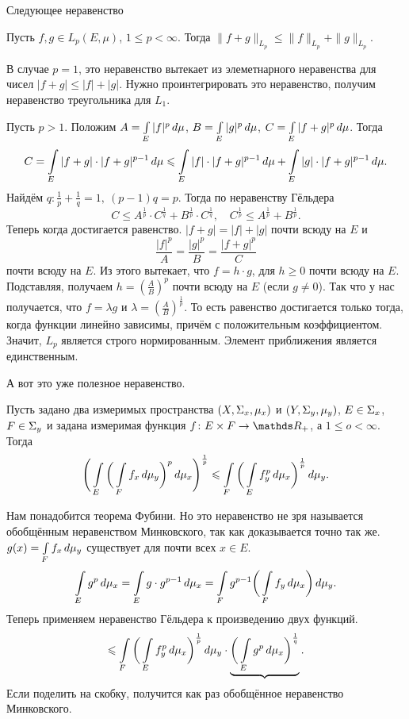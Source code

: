 Следующее неравенство
\begin{Ut}
  Пусть $f,g\in L_p(E,\mu)$, $1\le p<\infty$. Тогда $\|f+g\|_{L_p}\le \|f\|_{L_p}+\|g\|_{L_p}$.
\end{Ut}
\begin{Proof}
  В случае $p=1$, это неравенство вытекает из элеметнарного неравенства для чисел $|f+g|\le |f|+|g|$. Нужно проинтегрировать это неравенство, получим неравенство треугольника для $L_1$.

Пусть $p>1$. Положим $A = \int\limits_{E}|f|^p\,d\mu$, $B = \int\limits_{E}|g|^p\,d\mu$, $C = \int\limits_{E}|f+g|^p\,d\mu$. Тогда 
\[
  C = \int\limits_{E}|f+g|\cdot |f+g|^{p-1}\,d\mu\leqslant \int\limits_{E}|f|\cdot |f+g|^{p-1}\,d\mu+\int\limits_{E}|g|\cdot |f+g|^{p-1}\,d\mu.
\]
Найдём $q\colon \frac1p+\frac1q =1,\ (p-1)q = p$. Тогда по неравенству Гёльдера
\[
  C\le A^{\frac1p}\cdot C^{\frac1q} + B^{\frac1p}\cdot C^{\frac 1q}, \quad C^{\frac1p}\le A^{\frac1p} + B^{\frac1p}.
\]
Теперь когда достигается равенство. $|f+g| = |f|+|g|$ почти всюду на $E$ и 
\[
  \frac{|f|^p}A = \frac{|g|^p}B = \frac{|f+g|^p}C
\]
почти всюду на $E$. Из этого вытекает, что $f = h\cdot g $, для $h\ge 0$ почти всюду на $E$. Подставляя, получаем $h = \left(\frac AB\right)^p$ почти всюду на $E$ (если $g\ne 0$). Так что у нас получается, что $f=\lambda g$ и  $\lambda = \left(\frac AB\right)^{\frac1p}$. То есть равенство достигается только тогда, когда функции линейно зависимы, причём с положительным коэффициентом. Значит, $L_p$ является строго нормированным. Элемент приближения является единственным.
\end{Proof}

А вот это уже полезное неравенство.
\begin{Ut}
  Пусть задано два измеримых пространства $(X,\Sigma_x,\mu_x)$ и $(Y,\Sigma_y,\mu_y)$, $E\in\Sigma_x$, $F\in \Sigma_y$ и задана измеримая функция $f\colon E\times F\to \R_+$, а $1\le o<\infty$. Тогда
\[
  \Bigg(\int\limits_{E}\bigg(\int\limits_{F}f_x\,d\mu_y\bigg)^p\,d\mu_x\Bigg)^{\frac1p}\leqslant \int\limits_{F}\bigg(\int\limits_{E}f_y^p\,d\mu_x\bigg)^{\frac1p}\,d\mu_y.
\]
\end{Ut}
\begin{Proof}
  Нам понадобится теорема Фубини. Но это неравенство не зря называется обобщённым неравенством Минковского, так как доказывается точно так же. $g(x) = \int\limits_{F}f_x\,d\mu_y$ существует для почти всех $x\in E$.
\[
  \int\limits_{E}g^p\,d\mu_x = \int\limits_{E}g\cdot g^{p-1}\,d\mu_x = \int\limits_{F}g^{p-1}\bigg(\int\limits_{F}f_y\,d\mu_x\bigg)\,d\mu_y.
\]
Теперь применяем неравенство Гёльдера к произведению двух функций.
\[
 \leqslant \int\limits_{F}\bigg(\int\limits_{E} f_y^p\,d\mu_x\bigg)^{\frac1p}\,d\mu_y\cdot \underbrace{\bigg(\int\limits_{E}g^p\,d\mu_x\bigg)^{\frac1q}}.
\]
Если поделить на скобку, получится как раз обобщённое неравенство Минковского.
\end{Proof}

